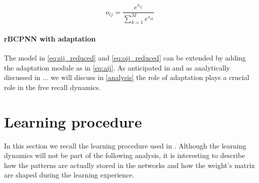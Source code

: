 \begin{equation}
    o_{ij} = \frac{e^{s_{ij}}}{ \sum\limits_{k=1}^M e^{s_{ik}}} 
    \label{eq:oij_reduced}
\end{equation}

\paragraph{rBCPNN with adaptation}

The model in \eqref{eq:sij_reduced} and \eqref{eq:oij_reduced} can be extended by adding the adaptation module as in \eqref{eq:aij}. As anticipated in and as analytically discussed in ... we will discuss in \cref{analysis} the role of adaptation plays a crucial role in the free recall dynamics.

\section{Learning procedure}
In this section we recall the learning procedure used in \cite{LansnerFRC}. Although the learning dynamics will not be part of the following analysis, it is interesting to describe how the patterns are actually stored in the networks and how the weight's matrix are shaped during the learning experience. 




